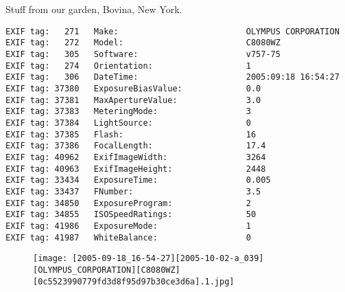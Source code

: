 
\clearpage
\section{\protect{}}
\noindent Stuff from our garden, Bovina, New York.
\noindent
\begin{lstlisting}
EXIF tag:   271   Make:                          OLYMPUS CORPORATION
EXIF tag:   272   Model:                         C8080WZ
EXIF tag:   305   Software:                      v757-75
EXIF tag:   274   Orientation:                   1
EXIF tag:   306   DateTime:                      2005:09:18 16:54:27
EXIF tag: 37380   ExposureBiasValue:             0.0
EXIF tag: 37381   MaxApertureValue:              3.0
EXIF tag: 37383   MeteringMode:                  3
EXIF tag: 37384   LightSource:                   0
EXIF tag: 37385   Flash:                         16
EXIF tag: 37386   FocalLength:                   17.4
EXIF tag: 40962   ExifImageWidth:                3264
EXIF tag: 40963   ExifImageHeight:               2448
EXIF tag: 33434   ExposureTime:                  0.005
EXIF tag: 33437   FNumber:                       3.5
EXIF tag: 34850   ExposureProgram:               2
EXIF tag: 34855   ISOSpeedRatings:               50
EXIF tag: 41986   ExposureMode:                  1
EXIF tag: 41987   WhiteBalance:                  0

\end{lstlisting}
\clearpage
\begin{figure}
\raggedleft
\texttt{[image: [2005-09-18\_16-54-27][2005-10-02-a\_039][OLYMPUS\_CORPORATION][C8080WZ][0c5523990779fd3d8f95d97b30ce3d6a].1.jpg]}
\end{figure}


\clearpage
